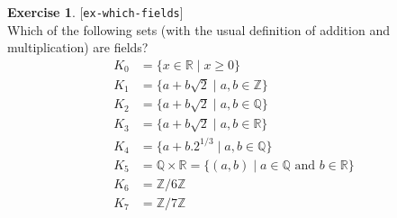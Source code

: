 \documentclass{amsart}
\newcommand{\Z}         {{\mathbb{Z}}}
\newcommand{\Q}         {{\mathbb{Q}}}
\newcommand{\R}         {{\mathbb{R}}}
\newcommand{\st}        {\;|\;}
\newcommand{\tm}        {\times}
\renewcommand{\:}{\colon}
\newcommand{\lastexlabel}{}
\newcommand{\exlabel}[1]{
 \global\def\lastexlabel{#1}\label{#1}[\texttt{#1}]\ \\
}
\newcommand{\exlabel}[1]{
 \global\def\lastexlabel{#1}\label{#1}
}
\theoremstyle{definition}
\newtheorem{exercise}{Exercise}[section]
\begin{document}
\begin{exercise}\exlabel{ex-which-fields}
 Which of the following sets (with the usual definition of addition
 and multiplication) are fields?
 \begin{align*}
  K_0 &= \{x\in\R\st x\geq 0\} \\
  K_1 &= \{a+b\sqrt{2}\st a,b\in\Z\} \\
  K_2 &= \{a+b\sqrt{2}\st a,b\in\Q\} \\
  K_3 &= \{a+b\sqrt{2}\st a,b\in\R\} \\
  K_4 &= \{a+b.2^{1/3}\st a,b\in\Q\} \\
  K_5 &= \Q\tm\R = \{(a,b)\st a\in\Q \text{ and } b\in\R\} \\
  K_6 &= \Z/6\Z \\
  K_7 &= \Z/7\Z
 \end{align*}
\end{exercise}
\end{document}
